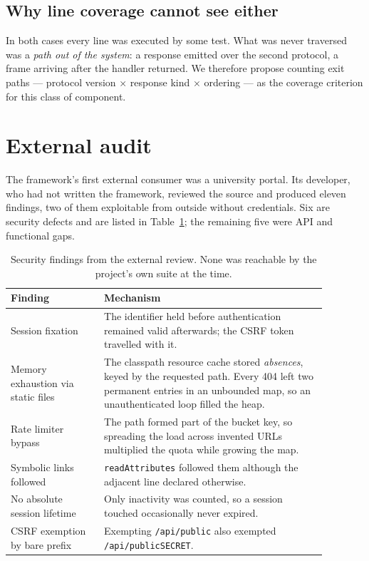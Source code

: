 \documentclass[preprint,12pt]{elsarticle}
\begin{document}
\subsection{Why line coverage cannot see either}

In both cases every line was executed by some test. What was never traversed was
a \emph{path out of the system}: a response emitted over the second protocol, a
frame arriving after the handler returned. We therefore propose counting exit
paths --- protocol version $\times$ response kind $\times$ ordering --- as the
coverage criterion for this class of component.

\section{External audit}
\label{sec:audit}

The framework's first external consumer was a university portal. Its developer,
who had not written the framework, reviewed the source and produced eleven
findings, two of them exploitable from outside without credentials. Six are
security defects and are listed in Table~\ref{tab:audit}; the remaining five
were API and functional gaps.

\begin{table}[ht]
\centering
\caption{Security findings from the external review. None was reachable by the
         project's own suite at the time.}
\label{tab:audit}
\begin{tabular}{p{0.26\linewidth}p{0.62\linewidth}}
\toprule
Finding & Mechanism \\
\midrule
Session fixation &
  The identifier held before authentication remained valid afterwards; the CSRF
  token travelled with it. \\
Memory exhaustion via static files &
  The classpath resource cache stored \emph{absences}, keyed by the requested
  path. Every 404 left two permanent entries in an unbounded map, so an
  unauthenticated loop filled the heap. \\
Rate limiter bypass &
  The path formed part of the bucket key, so spreading the load across invented
  URLs multiplied the quota while growing the map. \\
Symbolic links followed &
  \texttt{readAttributes} followed them although the adjacent line declared
  otherwise. \\
No absolute session lifetime &
  Only inactivity was counted, so a session touched occasionally never expired. \\
CSRF exemption by bare prefix &
  Exempting \texttt{/api/public} also exempted
  \texttt{/api/publicSECRET}. \\
\bottomrule
\end{tabular}
\end{table}
\end{document}
